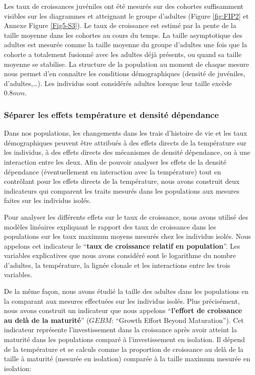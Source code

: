 Les taux de croissances juvéniles ont été mesurés sur des cohortes suffisamment
visibles sur les diagrammes et atteignant le groupe d'adultes (Figure
\ref{fig:FIP2} et Annexe Figure \ref{Fig5-S3}).
Le taux de croissance est estimé par la pente de la taille moyenne dans les cohortes au
cours du temps. La taille asymptotique des adultes est mesurée comme la taille
moyenne du groupe d'adultes une fois que la cohorte a totalement fusionné avec
les adultes déjà présents, ou quand sa taille moyenne se stabilise. La structure
de la population au moment de chaque mesure nous permet d'en connaître les
conditions démographiques (densité de juvéniles, d'adultes,\ldots). Les
individus sont considérés adultes lorsque leur taille excède $0.8mm$.

\subsubsection{Séparer les effets température et densité dépendance}

Dans nos populations, les changements dans les trais d'histoire de vie et les
taux démographiques peuvent être attribués à des effets directs de la
température sur les individus, à des effets directs des mécanismes de densité dépendance, ou
à une interaction entre les deux. Afin de pouvoir analyser les effets de la
densité dépendance (éventuellement en interaction avec la température) tout en
contrôlant pour les effets directs de la température, nous avons construit deux
indicateurs qui comparent les traits mesurés dans les populations aux mesures
faites sur les individus isolés. 

Pour analyser les différents effets sur le taux de croissance, nous avons
utilisé des modèles linéaires expliquant le rapport des taux de croissance dans
les populations sur les taux maximum moyens mesurés chez les individus isolés.
Nous appelons cet indicateur le ``\textbf{taux de croissance relatif en
population}''. Les variables explicatives que nous avons considéré sont le
logarithme du nombre d'adultes, la température, la lignée clonale et les
interactions entre les trois variables. 

De la même façon, nous avons étudié la taille des adultes dans les populations
en la comparant aux mesures effectuées sur les individus isolés. Plus
précisément, nous avons construit un indicateur que nous appelons
``\textbf{l'effort de croissance au delà de la maturité}'' ($GEBM$: ``Growth
Effort Beyond Maturation''). Cet indicateur représente l'investissement dans la
croissance après avoir atteint la maturité dans les populations comparé
à l'investissement en isolation. Il dépend de la température et se calculs comme
la proportion de croissance au delà de la taille à maturité (mesurée en isolation) comparée à la taille
maximum mesurée en isolation:

